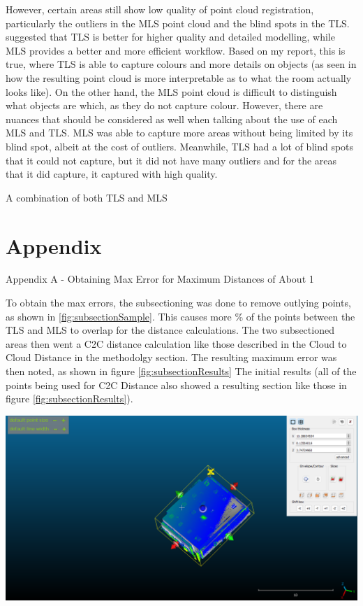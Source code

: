 \documentclass[man]{apa7}
\begin{document}
However, certain areas still show low quality of point cloud registration, particularly the outliers in the MLS point cloud and the blind spots in the TLS. \Textcite{conti2024} suggested that TLS is better for higher quality and detailed modelling, while MLS provides a better and more efficient workflow. Based on my report, this is true, where TLS is able to capture colours and more details on objects (as seen in how the resulting point cloud is more interpretable as to what the room actually looks like). On the other hand, the MLS point cloud is difficult to distinguish what objects are which, as they do not capture colour. However, there are nuances that should be considered as well when talking about the use of each MLS and TLS. MLS was able to capture more areas without being limited by its blind spot, albeit at the cost of outliers. Meanwhile, TLS had a lot of blind spots that it could not capture, but it did not have many outliers and for the areas that it did capture, it captured with high quality.

A combination of both TLS and MLS

\printbibliography

\newpage

\section{Appendix}
Appendix A - Obtaining Max Error for Maximum Distances of About 1

To obtain the max errors, the subsectioning was done to remove outlying points, as shown in \ref{fig:subsectionSample}. This causes more \% of the points between the TLS and MLS to overlap for the distance calculations. The two subsectioned areas then went a C2C distance calculation like those described in the Cloud to Cloud Distance in the methodolgy section. The resulting maximum error was then noted, as shown in figure \ref{fig:subsectionResults} The initial results (all of the points being used for C2C Distance also showed a resulting section like those in figure \ref{fig:subsectionResults}).

\begin{minipage}{\linewidth}
  \includegraphics[height=\textheight/6 ,width=\textwidth/2]{figures/exampleSubsectioning.png}
  \label{fig:subsectionSample}
\end{minipage}
\end{document}
